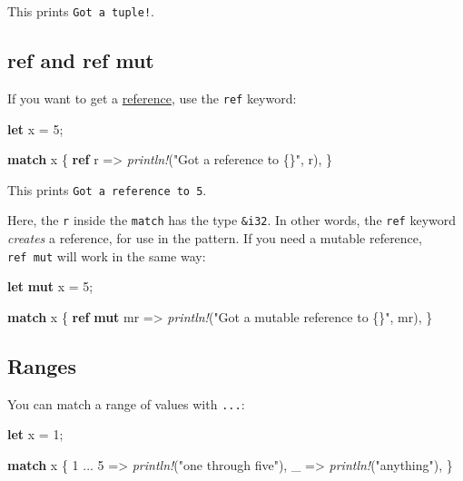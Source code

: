 \documentclass[a4paper,]{book}
\newenvironment{Shaded}{\begin{snugshade}}{\end{snugshade}}
\newcommand{\KeywordTok}[1]{\textcolor[rgb]{0.13,0.29,0.53}{\textbf{{#1}}}}
\newcommand{\DecValTok}[1]{\textcolor[rgb]{0.00,0.00,0.81}{{#1}}}
\newcommand{\StringTok}[1]{\textcolor[rgb]{0.31,0.60,0.02}{{#1}}}
\newcommand{\PreprocessorTok}[1]{\textcolor[rgb]{0.56,0.35,0.01}{\textit{{#1}}}}
\newcommand{\NormalTok}[1]{{#1}}
\begin{document}
This prints \texttt{Got\ a\ tuple!}.

\subsection{ref and ref mut}\label{ref-and-ref-mut}

If you want to get a
\protect\hyperlink{sec--references-and-borrowing}{reference}, use the
\texttt{ref} keyword:

\begin{Shaded}
\begin{Highlighting}[]
\KeywordTok{let} \NormalTok{x = }\DecValTok{5}\NormalTok{;}

\KeywordTok{match} \NormalTok{x \{}
    \KeywordTok{ref} \NormalTok{r => }\PreprocessorTok{println!}\NormalTok{(}\StringTok{"Got a reference to \{\}"}\NormalTok{, r),}
\NormalTok{\}}
\end{Highlighting}
\end{Shaded}

This prints \texttt{Got\ a\ reference\ to\ 5}.

Here, the \texttt{r} inside the \texttt{match} has the type
\texttt{\&i32}. In other words, the \texttt{ref} keyword \emph{creates}
a reference, for use in the pattern. If you need a mutable reference,
\texttt{ref\ mut} will work in the same way:

\begin{Shaded}
\begin{Highlighting}[]
\KeywordTok{let} \KeywordTok{mut} \NormalTok{x = }\DecValTok{5}\NormalTok{;}

\KeywordTok{match} \NormalTok{x \{}
    \KeywordTok{ref} \KeywordTok{mut} \NormalTok{mr => }\PreprocessorTok{println!}\NormalTok{(}\StringTok{"Got a mutable reference to \{\}"}\NormalTok{, mr),}
\NormalTok{\}}
\end{Highlighting}
\end{Shaded}

\subsection{Ranges}\label{ranges}

You can match a range of values with \texttt{...}:

\begin{Shaded}
\begin{Highlighting}[]
\KeywordTok{let} \NormalTok{x = }\DecValTok{1}\NormalTok{;}

\KeywordTok{match} \NormalTok{x \{}
    \DecValTok{1} \NormalTok{... }\DecValTok{5} \NormalTok{=> }\PreprocessorTok{println!}\NormalTok{(}\StringTok{"one through five"}\NormalTok{),}
    \NormalTok{_ => }\PreprocessorTok{println!}\NormalTok{(}\StringTok{"anything"}\NormalTok{),}
\NormalTok{\}}
\end{Highlighting}
\end{Shaded}
\end{document}
